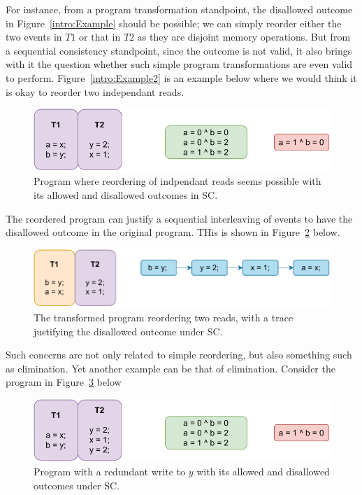     For instance, from a program transformation standpoint, the disallowed outcome in Figure~\ref{intro:Example} should be possible; we can simply reorder either the two events in $T1$ or that in $T2$ as they are disjoint memory operations. 
    But from a sequential consistency standpoint, since the outcome is not valid, it also brings with it the question whether such simple program transformations are even valid to perform.
    Figure~\ref{intro:Example2} is an example below where we would think it is okay to reorder two independant reads. 
    \begin{figure}[H]
        \centering
        \includegraphics[scale=1]{2.Background/SC_Reordering(a).pdf}
        \caption{Program where reordering of indpendant reads seems possible with its allowed and disallowed outcomes in SC.}
        \label{intro:Example2(a)}
    \end{figure}

    The reordered program can justify a sequential interleaving of events to have the disallowed outcome in the original program. 
    THis is shown in Figure~\ref{intro:Example2(b)} below.

    \begin{figure}[H]
        \centering
        \includegraphics[scale=1]{2.Background/SC_Reordering(b).pdf}
        \caption{The transformed program reordering two reads, with a trace justifying the disallowed outcome under SC.}
        \label{intro:Example2(b)}
    \end{figure}



    Such concerns are not only related to simple reordering, but also something such as elimination. 
    Yet another example can be that of elimination. Consider the program in Figure~\ref{intro:Example3(a)} below
    \begin{figure}[H]
        \centering
        \includegraphics[scale=1]{2.Background/SC_Example2(a).pdf}
        \caption{Program with a redundant write to $y$ with its allowed and disallowed outcomes under SC.}
        \label{intro:Example3(a)}
    \end{figure}

